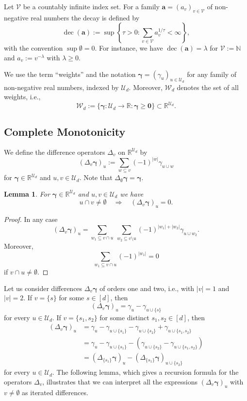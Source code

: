 \documentclass{article}
\newcommand{\R}  {{\mathbb R}}
\newcommand{\N}  {{\mathbb N}}
\newcommand{\bg}{{\boldsymbol{\gamma}}}
\newcommand{\bn}{{\boldsymbol{0}}}
\newcommand{\bsa}{\boldsymbol{a}}
\newcommand{\U}  {\mathcal{U}}
\newcommand{\V}  {\mathcal{V}}
\newcommand{\W}  {\mathcal{W}}
\DeclareMathOperator{\decay}{dec}
\theoremstyle{plain}
\newtheorem{lemma}{Lemma}
\theoremstyle{definition}
\begin{document}
Let $\V$ be a countably infinite index set. For a 
family $\bsa=(a_v)_{v\in\mathcal{V}}$ of non-negative real
numbers the decay is defined by
\[
\decay\left(\bsa\right)
:=\sup\left\{\tau>0:
\sum_{v\in\V} a_v^{1/\tau} <\infty \right\},
\]
with the convention $\sup\emptyset = 0$. For instance,
we have 
$\decay\left(\bsa\right) = \lambda$ for $\V := \N$ and
$a_v:= v^{-\lambda}$ with $\lambda\geq 0$.

We use the term ``weights'' and the notation 
$\bg=\left(\gamma_u\right)_{u\in \U_d}$
for any family of non-negative real numbers,
indexed by $\U_d$. Moreover, $\W_d$ denotes
the set of all weights, i.e.,
\[
\W_d := \{ \bg \colon \U_d \to \R : \bg \geq \bn \} \subset \R^{\U_d}.
\]

\subsection{Complete Monotonicity}

We define the difference operators $\Delta_v$ on $\R^{\U_d}$ by
\[
\left(\Delta_v \bg \right)_u := 
\sum_{w\subseteq v} (-1)^{|w|} \gamma_{u\cup w}
\]
for $\bg \in \R^{\U_d}$ 
and $u,v \in \U_d$.
Note that $\Delta_\emptyset \bg = \bg$.

\begin{lemma}\label{l1}
For $\bg \in \R^{\U_d}$ and $u,v \in \U_d$ we have 
\[
u \cap v \neq \emptyset \quad \Rightarrow \quad
\left(\Delta_v \bg \right)_u = 0.
\]
\end{lemma}

\begin{proof}
In any case 
\[
\left(\Delta_v \bg \right)_u =
\sum_{w_1\subseteq v \cap u}\ \sum_{w_2\subseteq v \setminus u} 
(-1)^{|w_1|+|w_2|} \gamma_{u\cup w_2}.
\]
Moreover,
\[
\sum_{w_1\subseteq v \cap u} (-1)^{|w_1|} = 0
\]
if $v \cap u \neq \emptyset$.
\end{proof}

Let us consider differences $\Delta_v \bg$ of orders one and
two, i.e., with $|v|=1$ and $|v|=2$. 
If
$v=\{s\}$ for some $s\in [d]$, then
\[
\left(\Delta_v \bg \right)_u = \gamma_u - \gamma_{u\cup \{s\}}
\]
for every $u \in \U_d$.
If $v=\{s_1,s_2\}$ for some distinct 
$s_1,s_2 \in [d]$, then 
\begin{align*}
 \left(\Delta_v \bg \right)_u 
 &= \gamma_u - \gamma_{u\cup \{s_1\}} 
 - \gamma_{u \cup \{s_2\}} 
 + \gamma_{u \cup \{s_1,s_2\}}\nonumber\\
 &= \gamma_u - \gamma_{u\cup \{s_1\}} 
 -  \left(\gamma_{u \cup \{s_2\}} - 
\gamma_{u \cup \{s_1,s_2\}}\right)\\
&= \left( \Delta_{\{s_1\}} \bg \right)_u -   
\left( \Delta_{\{s_1\}} \bg \right)_{u\cup \{s_2\}}
\end{align*}
for every $u \in \U_d$.
The following lemma, which
gives a recursion formula for the 
operators $\Delta_v$,
illustrates that we can interpret all the expressions 
$\left(\Delta_v \bg \right)_u$ with $v \neq \emptyset$
as iterated differences.
\end{document}
